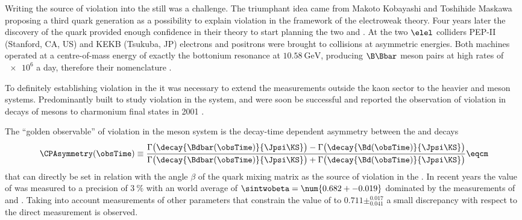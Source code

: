 Writing the source of \CP violation into the \SM still was a challenge. The
triumphant idea came from Makoto Kobayashi and Toshihide Maskawa
\cite{Kobayashi:1973fv} proposing a third quark generation as a possibility to
explain \CP violation in the framework of the electroweak theory. Four years
later the discovery of the \bquark quark \cite{Herb:1977ek} provided enough
confidence in their theory to start planning the two \BFactories \Babar and
\Belle. At the two $\elel$ colliders PEP-II (Stanford, CA, US) and KEKB
(Tsukuba, JP) electrons and positrons were brought to collisions at asymmetric
energies. Both machines operated at a centre-of-mass energy of exactly the
\YFourS bottonium resonance at $\SI{10.58}{\GeV}$, producing $\B\Bbar$ meson
pairs at high rates of $\num{e6}$ a day, therefore their nomenclature
\cite{Bevan:2014iga}.

To definitely establishing \CP violation in the \SM it was necessary to extend
the measurements outside the kaon sector to the heavier \B and \D meson systems.
Predominantly built to study \CP violation in the \Bmeson system, \Babar and
\Belle were soon be successful and reported the observation of \CP violation in
decays of \Bd mesons to charmonium final states in 2001
\cite{Aubert:2001nu,Abe:2001xe}.

The \enquote{golden observable} \cite{Bevan:2014iga} of \CP violation in the \Bd
meson system is the decay-time dependent \CP asymmetry between the  \BdToJpsiKS
and \BdbarToJpsiKS decays
%
\begin{equation*}\label{eq:cpv_theory:bd2jpsiks:cp_asymmetry}
    \CPAsymmetry(\obsTime) \equiv 
      \frac{\Gamma\bigl(\decay{\Bdbar(\obsTime)}{\Jpsi\KS}\bigr) - \Gamma\bigl(\decay{\Bd(\obsTime)}{\Jpsi\KS}\bigr)}
           {\Gamma\bigl(\decay{\Bdbar(\obsTime)}{\Jpsi\KS}\bigr) + \Gamma\bigl(\decay{\Bd(\obsTime)}{\Jpsi\KS}\bigr)} \eqcm
\end{equation*}
%
that can directly be set in relation with the angle $\beta$ of the \CKM quark
mixing matrix as the source of \CP violation in the \SM. In recent years the
value of \sintwobeta was measured to a precision of $\SI{3}{\percent}$ with an
world average of $\sintwobeta = \num{0.682 +- 0.019}$ dominated by the
measurements of \Babar and \Belle \cite{Amhis:2014hma}. Taking into account
measurements of other parameters that constrain the value of \sintwobeta to
$0.711\pm^{0.017}_{0.041}$ \cite{Charles:2015gya} a small discrepancy with
respect to the direct measurement is observed.



